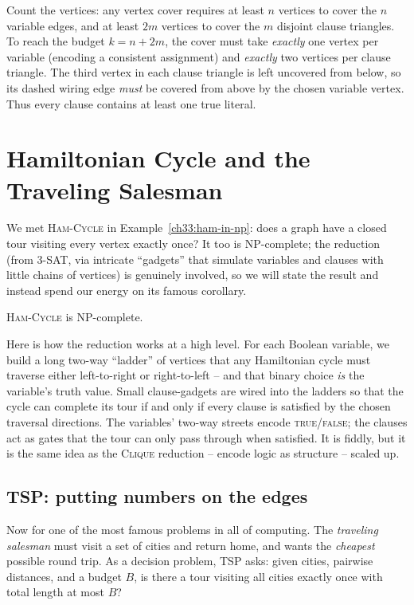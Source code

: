 \begin{intuitionbox}
Count the vertices: any vertex cover requires at least $n$ vertices to cover
the $n$ variable edges, and at least $2m$ vertices to cover the $m$ disjoint
clause triangles. To reach the budget $k = n + 2m$, the cover must take
\emph{exactly} one vertex per variable (encoding a consistent assignment) and
\emph{exactly} two vertices per clause triangle. The third vertex in each clause
triangle is left uncovered from below, so its dashed wiring edge \emph{must} be
covered from above by the chosen variable vertex. Thus every clause contains at
least one true literal.
\end{intuitionbox}

\section{Hamiltonian Cycle and the Traveling Salesman}

We met \textsc{Ham-Cycle} in Example~\ref{ch33:ham-in-np}: does a graph have a
closed tour visiting every vertex exactly once? It too is NP-complete; the
reduction (from \textsc{3-SAT}, via intricate ``gadgets'' that simulate variables
and clauses with little chains of vertices) is genuinely involved, so we will
state the result and instead spend our energy on its famous corollary.

\begin{theorem}
\label{ch33:ham}
\textsc{Ham-Cycle} is NP-complete.
\end{theorem}

Here is how the reduction works at a high level. For each Boolean variable, we build a long
two-way ``ladder'' of vertices that any Hamiltonian cycle must traverse either left-to-right
or right-to-left -- and that binary choice \emph{is} the variable's truth value.
Small clause-gadgets are wired into the ladders so that the cycle can complete its
tour if and only if every clause is satisfied by the chosen traversal directions.
The variables' two-way streets encode \textsc{true}/\textsc{false}; the clauses
act as gates that the tour can only pass through when satisfied. It is fiddly, but
it is the same idea as the \textsc{Clique} reduction -- encode logic as structure
-- scaled up.

\subsection{TSP: putting numbers on the edges}

Now for one of the most famous problems in all of computing. The \emph{traveling
salesman} must visit a set of cities and return home, and wants the
\emph{cheapest} possible round trip. As a decision problem, \textsc{TSP} asks:
given cities, pairwise distances, and a budget $B$, is there a tour visiting all
cities exactly once with total length at most $B$?

